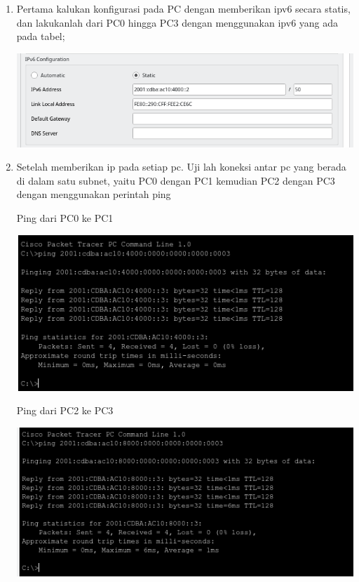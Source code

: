 \documentclass{article}
\begin{document}
\begin{flushleft}
\begin{enumerate}
            \item Pertama kalukan konfigurasi pada PC dengan memberikan ipv6 secara statis, dan lakukanlah dari PC0 hingga PC3 dengan menggunakan ipv6 yang ada pada tabel;

            \includegraphics[scale=0.6]{3-2.png}

            \item Setelah memberikan ip pada setiap pc. Uji lah koneksi antar pc yang berada di dalam satu subnet, yaitu PC0 dengan PC1 kemudian PC2 dengan PC3 dengan menggunakan perintah ping
            \newline
            \newline
            
            Ping dari PC0 ke PC1
            \begin{center}
                \includegraphics[scale=0.8]{3-3.png}
            \end{center}

            Ping dari PC2 ke PC3
            \begin{center}
                \includegraphics[scale=0.8]{3-4.png}
            \end{center}
                

\end{enumerate}
\end{flushleft}
\end{document}
